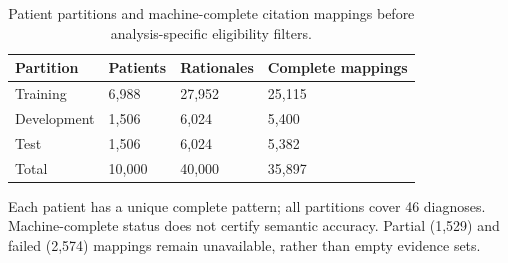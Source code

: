 \begin{table}[!tbp]\centering\footnotesize
\caption{Patient partitions and machine-complete citation mappings before analysis-specific eligibility filters.}\label{tab:cohort-partitions}
\begin{tabular}{llll}\toprule
Partition & Patients & Rationales & Complete mappings \\ \midrule
Training & 6,988 & 27,952 & 25,115 \\
Development & 1,506 & 6,024 & 5,400 \\
Test & 1,506 & 6,024 & 5,382 \\
Total & 10,000 & 40,000 & 35,897 \\
\bottomrule\end{tabular}
\par\smallskip Each patient has a unique complete pattern; all partitions cover 46 diagnoses. Machine-complete status does not certify semantic accuracy. Partial (1,529) and failed (2,574) mappings remain unavailable, rather than empty evidence sets.
\end{table}
